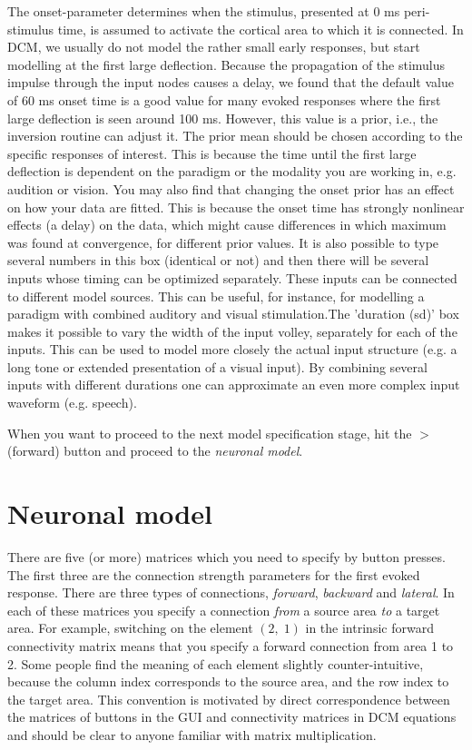 The onset-parameter determines when the stimulus,
presented at 0 ms peri-stimulus time, is assumed to activate the cortical area to which it is connected. In DCM, we usually do not model the rather small early responses, but start modelling at the first large
deflection. Because the propagation of the stimulus impulse through
the input nodes causes a delay, we found that the default value of 60
ms onset time is a good value for many evoked responses where the
first large deflection is seen around 100 ms. However, this value is a
prior, i.e., the inversion routine can adjust it. The prior mean should be chosen according to the specific responses of interest. This is because the time until the first large deflection is dependent on the paradigm or the modality you are working in, e.g. audition or vision.
You may also find that changing the onset prior has an effect on how your data are
fitted. This is because the onset time has strongly nonlinear effects
(a delay) on the data, which might cause differences in which maximum
was found at convergence, for different prior values. It is also possible to type several numbers in this box (identical or not) and then there will be several inputs whose timing can be optimized separately. These inputs can be connected to different model sources. This can be useful, for instance, for modelling a paradigm with combined auditory and visual stimulation.The 'duration (sd)' box makes it possible to vary the width of the input volley, separately for each of the inputs. This can be used to model more closely the actual input structure (e.g. a long tone or extended presentation of a visual input). By combining several inputs with different durations one can approximate an even more complex input waveform (e.g. speech).

When you want to proceed to the next model
specification stage, hit the $>$ (forward) button and proceed
to the \textit{neuronal model}.

\section{Neuronal model}
There are five (or more) matrices which you need to specify by button presses. The
first three are the connection strength parameters for the first
evoked response. There are three types of connections,
\textit{forward}, \textit{backward} and \textit{lateral}. In each of
these matrices you specify a connection \textit{from} a source area
\textit{to} a target area. For example, switching on the element
$(2,\;1)$ in the intrinsic forward connectivity matrix means that you
specify a forward connection from area 1 to 2. Some people find the
meaning of each element slightly counter-intuitive, because the
column index corresponds to the source area, and the row index to the
target area. This convention is motivated by direct correspondence between the matrices of buttons in the GUI and connectivity matrices in DCM equations and should be clear to anyone familiar with matrix multiplication.


